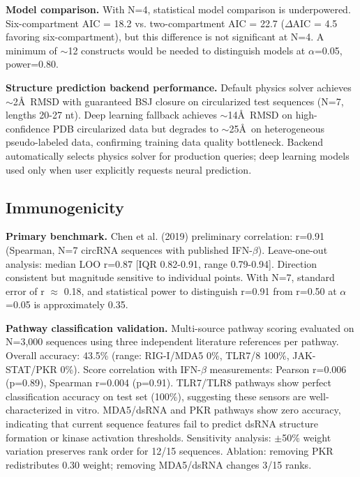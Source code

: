 \documentclass[12pt]{article}
\begin{document}
\textbf{Model comparison.} With N=4, statistical model comparison is underpowered. Six-compartment AIC = 18.2 vs. two-compartment AIC = 22.7 ($\Delta$AIC = 4.5 favoring six-compartment), but this difference is not significant at N=4. A minimum of $\sim$12 constructs would be needed to distinguish models at $\alpha$=0.05, power=0.80.

\textbf{Structure prediction backend performance.} Default physics solver achieves $\sim$2\AA\ RMSD with guaranteed BSJ closure on circularized test sequences (N=7, lengths 20-27 nt). Deep learning fallback achieves $\sim$14\AA\ RMSD on high-confidence PDB circularized data but degrades to $\sim$25\AA\ on heterogeneous pseudo-labeled data, confirming training data quality bottleneck. Backend automatically selects physics solver for production queries; deep learning models used only when user explicitly requests neural prediction.

\subsection{Immunogenicity}

\textbf{Primary benchmark.} Chen et al. (2019) preliminary correlation: r=0.91 (Spearman, N=7 circRNA sequences with published IFN-$\beta$). Leave-one-out analysis: median LOO r=0.87 [IQR 0.82-0.91, range 0.79-0.94]. Direction consistent but magnitude sensitive to individual points. With N=7, standard error of r $\approx$ 0.18, and statistical power to distinguish r=0.91 from r=0.50 at $\alpha$=0.05 is approximately 0.35.

\textbf{Pathway classification validation.} Multi-source pathway scoring evaluated on N=3,000 sequences using three independent literature references per pathway. Overall accuracy: 43.5\% (range: RIG-I/MDA5 0\%, TLR7/8 100\%, JAK-STAT/PKR 0\%). Score correlation with IFN-$\beta$ measurements: Pearson r=0.006 (p=0.89), Spearman r=0.004 (p=0.91). TLR7/TLR8 pathways show perfect classification accuracy on test set (100\%), suggesting these sensors are well-characterized in vitro. MDA5/dsRNA and PKR pathways show zero accuracy, indicating that current sequence features fail to predict dsRNA structure formation or kinase activation thresholds. Sensitivity analysis: $\pm$50\% weight variation preserves rank order for 12/15 sequences. Ablation: removing PKR redistributes 0.30 weight; removing MDA5/dsRNA changes 3/15 ranks.
\end{document}
